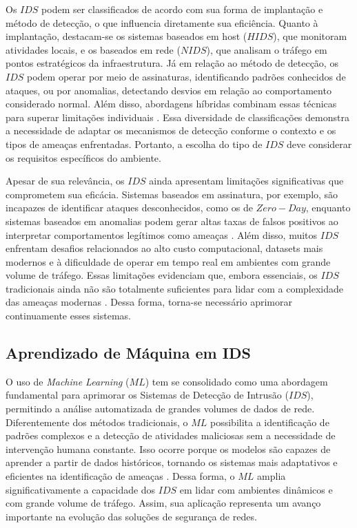 \documentclass[a4paper,10pt, twocolumn]{article}
\begin{document}
Os $IDS$ podem ser classificados de acordo com sua forma de implantação e método 
de detecção, o que influencia diretamente sua eficiência. Quanto à 
implantação, destacam-se os sistemas baseados em host ($HIDS$), que monitoram 
atividades locais, e os baseados em rede ($NIDS$), que analisam o tráfego em 
pontos estratégicos da infraestrutura. Já em relação ao método de detecção, 
os $IDS$ podem operar por meio de assinaturas, identificando padrões conhecidos 
de ataques, ou por anomalias, detectando desvios em relação ao comportamento 
considerado normal. Além disso, abordagens híbridas combinam essas técnicas 
para superar limitações individuais \cite{Khraisat2019Survey} \cite{zehedi2023comparative} \cite{Thakkar2021Survey} \cite{Khraisat2019Hybrid}. Essa diversidade de classificações 
demonstra a necessidade de adaptar os mecanismos de detecção conforme o 
contexto e os tipos de ameaças enfrentadas. Portanto, a escolha do tipo de $IDS$ 
deve considerar os requisitos específicos do ambiente. 

Apesar de sua relevância, os $IDS$ ainda apresentam limitações significativas 
que comprometem sua eficácia. Sistemas baseados em assinatura, por exemplo, 
são incapazes de identificar ataques desconhecidos, como os de $Zero-Day$, 
enquanto sistemas baseados em anomalias podem gerar altas taxas de falsos 
positivos ao interpretar comportamentos legítimos como ameaças \cite{Kazi2019network}. Além disso, 
muitos $IDS$ enfrentam desafios relacionados ao alto custo computacional, 
datasets mais modernos e à dificuldade de operar em tempo real em ambientes 
com grande volume de tráfego. Essas limitações evidenciam que, embora 
essenciais, os $IDS$ tradicionais ainda não são totalmente suficientes para 
lidar com a complexidade das ameaças modernas \cite{emad2022intrusion} \cite{patrick2022study}. Dessa forma, torna-se 
necessário aprimorar continuamente esses sistemas. 

\subsection{Aprendizado de Máquina em IDS}
O uso de \textit{Machine Learning} ($ML$) tem se consolidado como uma abordagem fundamental 
para aprimorar os Sistemas de Detecção de Intrusão ($IDS$), permitindo a 
análise automatizada de grandes volumes de dados de rede. Diferentemente dos 
métodos tradicionais, o $ML$ possibilita a identificação de padrões complexos e 
a detecção de atividades maliciosas sem a necessidade de intervenção humana 
constante. Isso ocorre porque os modelos são capazes de aprender a partir de 
dados históricos, tornando os sistemas mais adaptativos e eficientes na 
identificação de ameaças \cite{zehedi2023comparative} \cite{Thakkar2021Survey}. Dessa forma, o $ML$ amplia significativamente a 
capacidade dos $IDS$ em lidar com ambientes dinâmicos e com grande volume de 
tráfego. Assim, sua aplicação representa um avanço importante na evolução das 
soluções de segurança de redes. 
\end{document}
